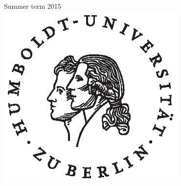 \documentclass[12pt]{article}
\begin{document}
\begin{titlepage}


{\large Summer term 2015 }\\[1cm] %

\vspace{-25pt}
\includegraphics{husiegel_sw_op.eps}\\[1cm] %
 

\vfill %

\end{titlepage}

\tableofcontents
\newpage
\end{document}
